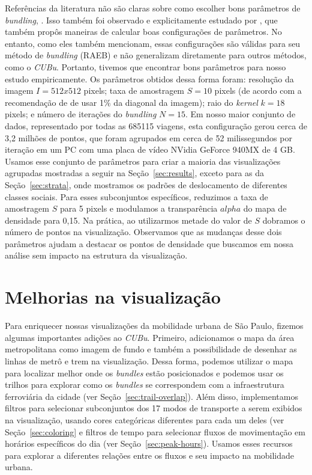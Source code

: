 Referências da literatura não são claras sobre como escolher bons parâmetros de
\emph{bundling}, \citet{Lhuillier2017}. Isso também foi observado e explicitamente
estudado por \citet{zeng:19}, que também propôs maneiras de calcular boas
configurações de parâmetros. No entanto, como eles também mencionam, essas
configurações são válidas para seu método de \emph{bundling} (RAEB) e não
generalizam diretamente para outros métodos, como o \emph{CUBu}. Portanto,
tivemos que encontrar bons parâmetros para nosso estudo empiricamente. Os
parâmetros obtidos dessa forma foram: resolução da imagem $I = 512 x 512$
pixels; taxa de amostragem $S = 10$ pixels (de acordo com a recomendação de
\cite{zwan:16} de usar 1\% da diagonal da imagem); raio do \emph{kernel} $k = 18$
pixels; e número de iterações do \emph{bundling} $N = 15$. Em nosso maior
conjunto de dados, representado por todas as \num{685115} viagens, esta
configuração gerou cerca de 3,2 milhões de pontos, que foram agrupados em cerca
de 52 milissegundos por iteração em um PC com uma placa de vídeo NVidia GeForce
940MX de 4 GB. Usamos esse conjunto de parâmetros para criar a maioria das
visualizações agrupadas mostradas a seguir na Seção~\ref{sec:results}, exceto para as da Seção~\ref{sec:strata},
onde mostramos os padrões de deslocamento de diferentes classes sociais.
Para esses subconjuntos específicos, reduzimos a taxa de amostragem $S$ para
5 pixels e modulamos a transparência $alpha$ do mapa de densidade para 0,15. Na
prática, ao utilizarmos metade do valor de $S$ dobramos o número de pontos na
visualização. Observamos que as mudanças desse dois parâmetros ajudam a
destacar os pontos de densidade que buscamos em nossa análise sem impacto na
estrutura da visualização.


\section{Melhorias na visualização}

Para enriquecer nossas visualizações da mobilidade urbana de São Paulo, fizemos
algumas importantes adições ao \emph{CUBu}. Primeiro, adicionamos o mapa da área
metropolitana como imagem de fundo e também a possibilidade de desenhar as
linhas de metrô e trem na visualização. Dessa forma, podemos utilizar o mapa
para localizar melhor onde os \emph{bundles} estão posicionados e podemos usar
os trilhos para explorar como os \emph{bundles} se correspondem com a
infraestrutura ferroviária da cidade (ver Seção~\ref{sec:trail-overlap}). Além
disso, implementamos filtros para selecionar subconjuntos dos 17 modos de
transporte a serem exibidos na visualização, usando cores categóricas diferentes
para cada um deles (ver Seção~\ref{sec:coloring} e filtros de tempo para selecionar fluxos de movimentação em
horários específicos do dia (ver Seção~\ref{sec:peak-hours}). Usamos esses recursos para explorar a diferentes
relações entre os fluxos e seu impacto na mobilidade urbana.
